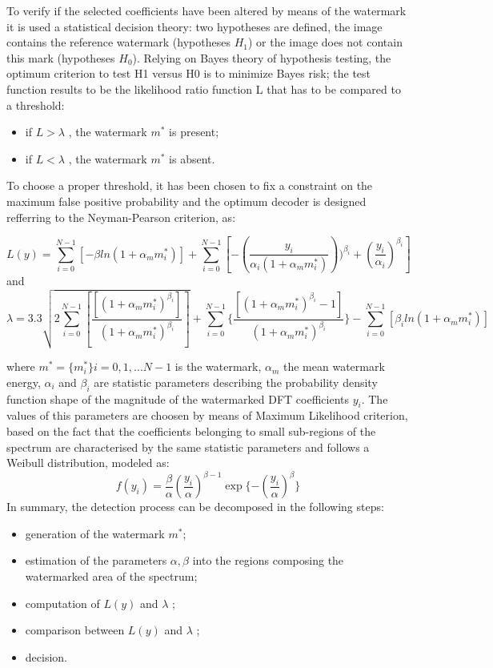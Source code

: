 To verify if the selected coefficients have been altered by means of the watermark it is used a statistical decision theory: two hypotheses are defined, the image contains the reference watermark (hypotheses $H_{1}$) or the image does not contain this mark (hypotheses $H_{0}$). Relying on Bayes theory of hypothesis testing, the optimum criterion to test H1 versus H0 is to minimize Bayes risk; the test function results to be the likelihood ratio function L that has to be compared to a threshold:\newline
\begin{itemize}
\item if $L > \lambda$ ,  the watermark $m^{*}$ is present;
\item if $L < \lambda$ , the watermark  $m^{*}$ is absent.
\end{itemize}

To choose a proper threshold, it has been chosen to fix a constraint on the maximum false positive probability and the optimum decoder is designed refferring to the Neyman-Pearson criterion, as: \newline

$$ L(y)=\sum_{i=0}^{N-1} [-\beta ln(1+\alpha_{m}m_{i}^{*})]+\sum_{i=0}^{N-1}[-(\frac{y_{i}}{\alpha_{i}(1+\alpha_{m}m_{i}^{*})}))^{\beta_{i}}+(\frac{y_{i}}{\alpha_{i}})^{\beta_{i}}] $$
and
$$\lambda=3.3\sqrt{2\sum_{i=0}^{N-1}[\frac{[(1+\alpha_{m}m_{i}^{*})^{\beta_{i}}]}{(1+\alpha_{m}m_{i}^{*})^{\beta_{i}}}]} + \sum_{i=0}^{N-1}\{\frac{[(1+\alpha_{m}m_{i}^{*})^{\beta_{i}}-1]}{(1+\alpha_{m}m_{i}^{*})^{\beta_{i}}}\} - \sum_{i=0}^{N-1}[\beta_{i}ln(1+\alpha_{m}m_{i}^{*})]$$

where  $m^{*} = \{ m^{*}_{i} \} i= 0,1,...N-1$ is the watermark, $\alpha_{m}$ the mean watermark energy, $\alpha_{i}$ and $\beta_{i}$ are statistic parameters describing the probability density function shape of the magnitude of the watermarked DFT coefficients $y_{i}$.\newline 
The values of this parameters are choosen by means of Maximum Likelihood criterion, based on the fact that the coefficients belonging to small
sub-regions of the spectrum are characterised by the same statistic parameters and follows a Weibull distribution, modeled as:
$$ f(y_{i}) = \frac{\beta}{\alpha}(\frac{y_{i}}{\alpha})^{\beta-1}\exp\{-(\frac{y_{i}}{\alpha})^{\beta}\}$$
In summary, the detection process can be decomposed in the following steps:
\begin{itemize}
\item generation of the watermark $m^{*}$;
\item estimation of the parameters $\alpha,\beta$ into the regions composing the watermarked area of the spectrum;
\item computation of $L(y)$ and $\lambda$ ;
\item comparison between $L(y)$ and $\lambda$ ;
\item decision.
\end{itemize}

